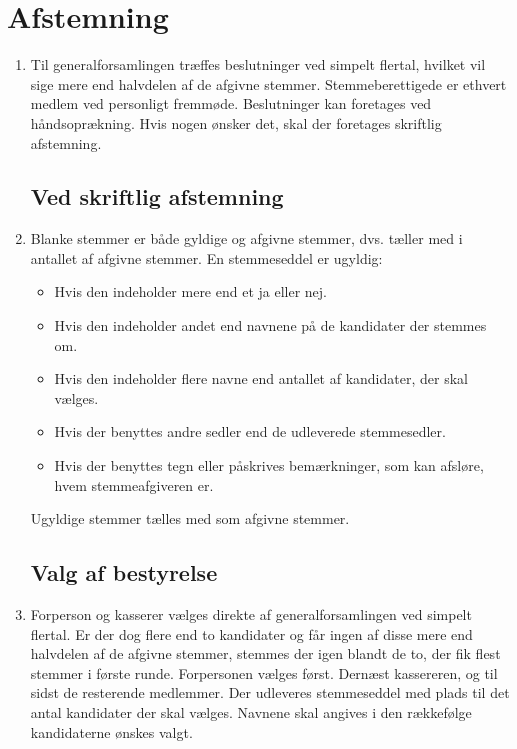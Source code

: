 \documentclass[a4paper, 10pt]{article}
\renewcommand\thesection{\textsection\arabic{section}}
\newenvironment{stykenum}{
  \begin{enumerate}[%
    label=Stk.~\arabic*., ref=\thesection~Stk.~\arabic*, start=1]
}{\end{enumerate}}
\begin{document}
\section{Afstemning}
\label{afstemning}

\begin{stykenum}

\item Til generalforsamlingen træffes beslutninger ved simpelt flertal,
hvilket vil sige mere end halvdelen af de afgivne stemmer.
Stemmeberettigede er ethvert med\-lem ved personligt fremmøde.
Beslutninger kan foretages ved håndsoprækning. Hvis nogen ønsker det,
skal der foretages skriftlig afstemning.

\subsection*{Ved skriftlig afstemning}

\item Blanke stemmer er både gyldige og afgivne stemmer, dvs. tæller med i
antallet af afgivne stemmer. En stemmeseddel er ugyldig:

\begin{itemize}

\item Hvis den indeholder mere end et ja eller nej.

\item Hvis den indeholder andet end navnene på de kandidater der
stemmes om.

\item Hvis den indeholder flere navne end antallet af kandidater, der
skal væl\-ges.

\item Hvis der benyttes andre sedler end de udleverede stemmesedler.

\item Hvis der benyttes tegn eller påskrives bemærkninger, som kan
afsløre, hvem stemmeafgiveren er.

\end{itemize}

Ugyldige stemmer tælles med som afgivne stemmer.

\subsection*{Valg af bestyrelse}

\item Forperson og kasserer vælges direkte af generalforsamlingen ved simpelt
flertal. Er der dog flere end to kandidater og får ingen af disse mere
end halvdelen af de afgivne stemmer, stemmes der igen blandt de to,
der fik flest stemmer i første runde. Forpersonen vælges først. Dernæst
kassereren, og til sidst de resterende medlemmer. Der udleveres
stemmeseddel med plads til det antal kandidater der skal vælges.
Navnene skal angives i den rækkefølge kandidaterne ønskes valgt.


\end{stykenum}
\end{document}
